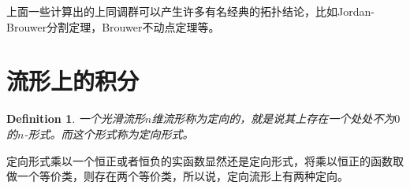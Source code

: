 \documentclass[11pt]{extbook}
\theoremstyle{plain}%
\newtheorem{defi}{Definition}[section]%
\begin{document}
上面一些计算出的上同调群可以产生许多有名经典的拓扑结论，比如Jordan-Brouwer分割定理，Brouwer不动点定理等。

\section{流形上的积分}
\begin{defi}
一个光滑流形$n$维流形称为定向的，就是说其上存在一个处处不为$0$的$n$-形式。而这个形式称为定向形式。
\end{defi}
定向形式乘以一个恒正或者恒负的实函数显然还是定向形式，将乘以恒正的函数取做一个等价类，则存在两个等价类，所以说，定向流形上有两种定向。
\end{document}

